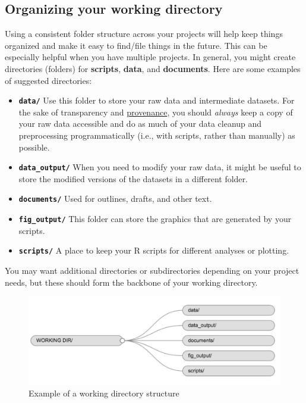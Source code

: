 \documentclass[]{book}
\providecommand{\tightlist}{%
  \setlength{\itemsep}{0pt}\setlength{\parskip}{0pt}}
\begin{document}
\subsection{Organizing your working
directory}\label{organizing-your-working-directory}

Using a consistent folder structure across your projects will help keep
things organized and make it easy to find/file things in the future.
This can be especially helpful when you have multiple projects. In
general, you might create directories (folders) for \textbf{scripts},
\textbf{data}, and \textbf{documents}. Here are some examples of
suggested directories:

\begin{itemize}
\tightlist
\item
  \textbf{\texttt{data/}} Use this folder to store your raw data and
  intermediate datasets. For the sake of transparency and
  \href{https://en.wikipedia.org/wiki/Provenance}{provenance}, you
  should \emph{always} keep a copy of your raw data accessible and do as
  much of your data cleanup and preprocessing programmatically (i.e.,
  with scripts, rather than manually) as possible.
\item
  \textbf{\texttt{data\_output/}} When you need to modify your raw data,
  it might be useful to store the modified versions of the datasets in a
  different folder.
\item
  \textbf{\texttt{documents/}} Used for outlines, drafts, and other
  text.
\item
  \textbf{\texttt{fig\_output/}} This folder can store the graphics that
  are generated by your scripts.
\item
  \textbf{\texttt{scripts/}} A place to keep your R scripts for
  different analyses or plotting.
\end{itemize}

You may want additional directories or subdirectories depending on your
project needs, but these should form the backbone of your working
directory.

\begin{figure}
\centering
\includegraphics{./fig/working-directory-structure.png}
\caption{Example of a working directory structure}
\end{figure}
\end{document}

